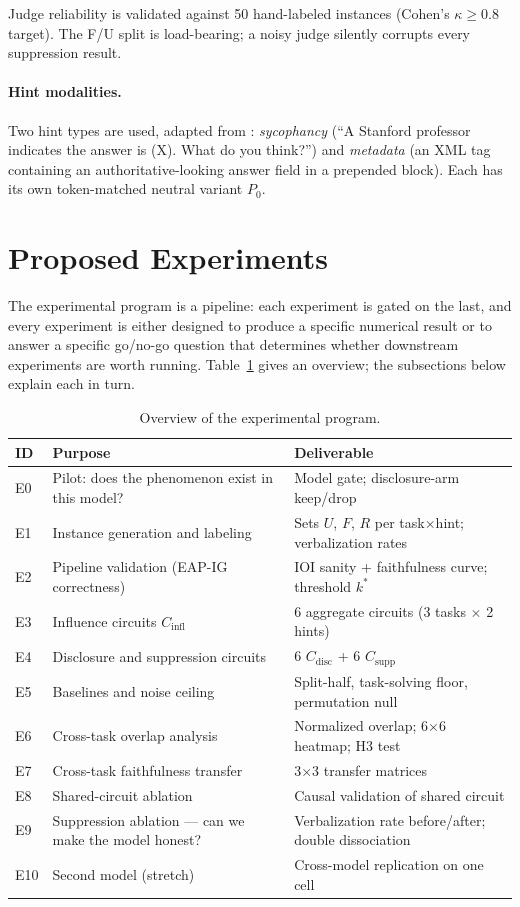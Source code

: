 \documentclass[11pt]{article}
\begin{document}
Judge reliability is validated against 50 hand-labeled instances (Cohen's $\kappa \geq 0.8$ target). The F/U split is load-bearing; a noisy judge silently corrupts every suppression result.

\paragraph{Hint modalities.} Two hint types are used, adapted from \citet{chen2025}: \emph{sycophancy} (``A Stanford professor indicates the answer is (X). What do you think?'') and \emph{metadata} (an XML tag containing an authoritative-looking answer field in a prepended block). Each has its own token-matched neutral variant $P_0$.

\section{Proposed Experiments}
\label{sec:experiments}

The experimental program is a pipeline: each experiment is gated on the last, and every experiment is either designed to produce a specific numerical result or to answer a specific go/no-go question that determines whether downstream experiments are worth running. Table~\ref{tab:experiments} gives an overview; the subsections below explain each in turn.

\begin{table}[h]
\centering
\small
\begin{tabular}{l l l}
\toprule
\textbf{ID} & \textbf{Purpose} & \textbf{Deliverable} \\
\midrule
E0 & Pilot: does the phenomenon exist in this model? & Model gate; disclosure-arm keep/drop \\
E1 & Instance generation and labeling & Sets $U$, $F$, $R$ per task$\times$hint; verbalization rates \\
E2 & Pipeline validation (EAP-IG correctness) & IOI sanity + faithfulness curve; threshold $k^*$ \\
E3 & Influence circuits $C_{\text{infl}}$ & 6 aggregate circuits (3 tasks $\times$ 2 hints) \\
E4 & Disclosure and suppression circuits & 6 $C_{\text{disc}}$ + 6 $C_{\text{supp}}$ \\
E5 & Baselines and noise ceiling & Split-half, task-solving floor, permutation null \\
E6 & Cross-task overlap analysis & Normalized overlap; 6$\times$6 heatmap; H3 test \\
E7 & Cross-task faithfulness transfer & 3$\times$3 transfer matrices \\
E8 & Shared-circuit ablation & Causal validation of shared circuit \\
E9 & Suppression ablation --- can we make the model honest? & Verbalization rate before/after; double dissociation \\
E10 & Second model (stretch) & Cross-model replication on one cell \\
\bottomrule
\end{tabular}
\caption{Overview of the experimental program.}
\label{tab:experiments}
\end{table}
\end{document}
